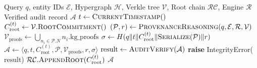 \documentclass[11pt,a4paper]{article}
\begin{document}
\begin{algorithm}[H]
\caption{VHP End-to-End Query Processing Pipeline}
\label{alg:pipeline}
\begin{algorithmic}[1]
\REQUIRE Query $q$, entity IDs $\mathcal{E}$, Hypergraph $\mathcal{H}$, Verkle tree $\mathcal{V}$, Root chain $\mathcal{RC}$, Engine $\mathcal{R}$
\ENSURE Verified audit record $\mathcal{A}$
\STATE $t \leftarrow \textsc{CurrentTimestamp}()$
\STATE $C_{\text{root}}^{(t)} \leftarrow \mathcal{V}.\textsc{RootCommitment}()$
\STATE {}
\STATE $(\mathcal{P}, r) \leftarrow \textsc{ProvenanceReasoning}(q, \mathcal{E}, \mathcal{R}, \mathcal{V})$
\STATE {}
\STATE $\mathcal{V}_{\text{proofs}} \leftarrow \bigcup_{n_i \in \mathcal{P}.N} n_i.\text{kg\_proofs}$
\STATE {}
\STATE $\sigma \leftarrow H(q \| t \| C_{\text{root}}^{(t)} \| \textsc{Serialize}(\mathcal{P}) \| r)$
\STATE $\mathcal{A} \leftarrow \langle q, t, C_{\text{root}}^{(t)}, \mathcal{P}, \mathcal{V}_{\text{proofs}}, r, \sigma \rangle$
\STATE {}
\STATE $\text{result} \leftarrow \textsc{AuditVerify}(\mathcal{A})$
    \STATE \textbf{raise} IntegrityError($\text{result}$)
\ENDIF
\STATE {}
\STATE $\mathcal{RC}.\textsc{AppendRoot}(C_{\text{root}}^{(t)})$
\RETURN $\mathcal{A}$
\end{algorithmic}
\end{algorithm}
\end{document}
